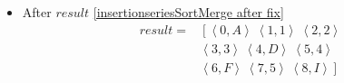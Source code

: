 \begin{frame}[containsverbatim]{\insertionseriesexampleframe}
\begin{columns}[c]
\begin{column}{0.7\textwidth}
{\begin{minipage}[c]{\textwidth}
\begin{multicols}{2}
\begin{itemize}
                                    \item After $result$ \cref{insertionseriesSortMerge after fix}
                                    \begin{align*}
                                        result = & \left[\left<0, A\right> \ \left<1, 1\right> \ \left<2, 2\right>\right. \\ 
                                        & \left.\left<3, 3\right> \ \left<4, D\right> \ \left<5, 4\right>\right. \\ 
                                        & \left.\left<6, F\right> \ \left<7, 5\right> \ \left<8, I\right>\right]
                                    \end{align*}
                                \end{itemize}
                            \end{multicols}
                        \end{minipage}
                    }
                \end{column}
            \end{columns}
        \end{frame}

